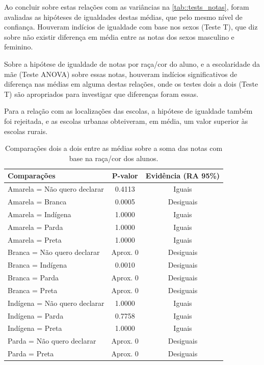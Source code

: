 Ao concluir sobre estas relações com as variâncias na \autoref{tab::tests_notas}, foram avaliadas as
hipóteses de igualdades destas médias, que pelo mesmo nível de confiança. Houveram indícios de igualdade 
com base nos sexos (Teste T), que diz sobre não existir diferença em média entre as notas dos sexos masculino e feminino.

Sobre a hipótese de igualdade de notas por raça/cor do aluno, e a escolaridade da mãe (Teste ANOVA)
sobre essas notas, houveram indícios significativos de diferença nas médias em alguma destas relações,
onde os testes dois a dois (Teste T) são apropriados para investigar que diferenças foram essas.

Para a relação com as localizações das escolas, a hipótese de igualdade também foi rejeitada, e as escolas 
urbanas obteiveram, em média, um valor superior às escolas rurais.


\newpage

\begin{table}[htb]
    \centering
\caption{Comparações dois a dois entre as médias sobre a soma das notas
        com base na raça/cor dos alunos.\label{tab:raca_cor_notas}}
    \begin{tabular}{lcc}
    \toprule
    Comparações & P-valor & Evidência (RA 95\%)\\
    \midrule \midrule
    Amarela = Não quero declarar & 0.4113 & Iguais\\
    Amarela = Branca & 0.0005 & Desiguais\\
    Amarela = Indígena & 1.0000 & Iguais\\
    Amarela = Parda & 1.0000 & Iguais\\
    Amarela = Preta & 1.0000 & Iguais\\
    Branca = Não quero declarar & Aprox. 0 & Desiguais\\
    Branca = Indígena & 0.0010 & Desiguais\\
    Branca = Parda & Aprox. 0 & Desiguais\\
    Branca = Preta & Aprox. 0 & Desiguais\\
    Indígena = Não quero declarar & 1.0000 & Iguais\\
    Indígena = Parda & 0.7758 & Iguais\\
    Indígena = Preta & 1.0000  & Iguais\\
    Parda = Não quero declarar & Aprox. 0 & Desiguais\\
    Parda = Preta & Aprox. 0 & Desiguais\\
    \bottomrule
    \end{tabular}
    \centering
    
\end{table}

